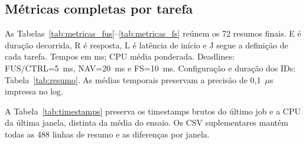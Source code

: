 \begin{landscape}
\section{Métricas completas por tarefa}
\label{ap:metricas}

\begin{singlespace}\small
As Tabelas~\ref{tab:metricas_fus}--\ref{tab:metricas_fs} reúnem os 72 resumos finais. E é duração decorrida, R é resposta, L é latência de início e J segue a definição de cada tarefa. Tempos em ms; CPU média ponderada. Deadlines: FUS/CTRL=5~ms, NAV=20~ms e FS=10~ms. Configuração e duração dos IDs: Tabela~\ref{tab:resumo}. As médias temporais preservam a precisão de 0,1~$\mu$s impressa no log.
\end{singlespace}

\clearpage

\clearpage

\clearpage

\end{landscape}
\noindent A Tabela~\ref{tab:timestamps} preserva os timestamps brutos do último job e a CPU da última janela, distinta da média do ensaio. Os CSV suplementares mantêm todas as 488 linhas de resumo e as diferenças por janela.

\clearpage
